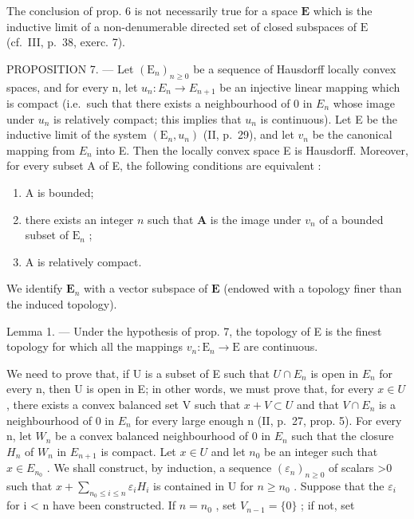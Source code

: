 The conclusion of prop. 6 is not necessarily true for a space \(\mathbf{E}\) which is the inductive limit of a non-denumerable directed set of closed subspaces of \(\mathrm{E}\) (cf.~III, p.~38, exerc. 7).

PROPOSITION 7. --- Let \((\mathrm{E}_{n})_{n\geq0}\) be a sequence of Hausdorff locally convex spaces, and for every n, let \(u_{n}:E_{n}\to E_{n+1}\) be an injective linear mapping which is compact (i.e.~such that there exists a neighbourhood of 0 in \(E_{n}\) whose image under \(u_{n}\) is relatively compact; this implies that \(u_{n}\) is continuous). Let E be the inductive limit of the system \((\mathrm{E}_{n},u_{n})\) (II, p.~29), and let \(v_{n}\) be the canonical mapping from \(E_{n}\) into E. Then the locally convex space E is Hausdorff. Moreover, for every subset A of E, the following conditions are equivalent :

\begin{enumerate}
\def\labelenumi{(\roman{enumi})}
\item
  A is bounded;
\item
  there exists an integer \(n\) such that \(\mathbf{A}\) is the image under \(v_{n}\) of a bounded subset of \(\mathrm{E}_n\) ;
\item
  A is relatively compact.
\end{enumerate}

We identify \(\mathbf{E}_n\) with a vector subspace of \(\mathbf{E}\) (endowed with a topology finer than the induced topology).

Lemma 1. --- Under the hypothesis of prop. 7, the topology of E is the finest topology for which all the mappings \(v_{n} : \mathrm{E}_{n} \to \mathrm{E}\) are continuous.

We need to prove that, if U is a subset of E such that \(U \cap E_{n}\) is open in \(E_{n}\) for every n, then U is open in E; in other words, we must prove that, for every \(x \in U\) , there exists a convex balanced set V such that \(x + V \subset U\) and that \(V \cap E_{n}\) is a neighbourhood of 0 in \(E_{n}\) for every large enough n (II, p.~27, prop. 5). For every n, let \(W_{n}\) be a convex balanced neighbourhood of 0 in \(E_{n}\) such that the closure \(H_{n}\) of \(W_{n}\) in \(E_{n+1}\) is compact. Let \(x \in U\) and let \(n_{0}\) be an integer such that \(x \in E_{n_{0}}\) . We shall construct, by induction, a sequence \((\varepsilon_{n})_{n \geqslant 0}\) of scalars \textgreater0 such that \(x + \sum_{n_{0} \leqslant i \leqslant n} \varepsilon_{i}H_{i}\) is contained in U for \(n \geqslant n_{0}\) . Suppose that the \(\varepsilon_{i}\) for i \textless{} n have been constructed. If \(n = n_{0}\) , set \(V_{n-1} = \{0\}\) ; if not, set

